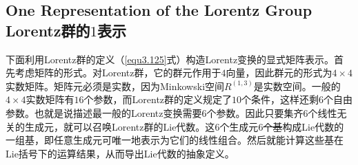 \subsection[Lorentz群的$1$表示]{One Representation of the Lorentz Group \quad Lorentz群的$1$表示}
\label{sec3.7.1}
下面利用Lorentz群的定义（\ref{equ3.125}式）构造Lorentz变换的显式矩阵表示。首先考虑矩阵的形式。对Lorentz群，它的群元作用于$4$向量，因此群元的形式为$4 \times 4$实数矩阵。矩阵元必须是实数，因为Minkowski空间$R^{(1, 3)}$是实数空间。一般的$4 \times 4$实数矩阵有$16$个参数，而Lorentz群的定义规定了$10$个条件，这样还剩$6$个自由参数。也就是说描述最一般的Lorentz变换需要$6$个参数。因此只要集齐$6$个线性无关的生成元，就可以召唤Lorentz群的Lie代数。这$6$个生成元\sout{$6$个基}构成Lie代数的一组基，即任意生成元可唯一地表示为它们的线性组合。然后就能计算这些基在Lie括号下的运算结果，从而导出Lie代数的抽象定义。

